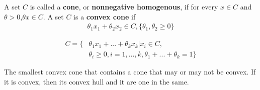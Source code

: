 \documentclass{article}
\begin{document}
\begin{definition}[Cone]
  A set $C$ is called a \textbf{cone}, or \textbf{nonnegative homogenous}, if for every
  $x\in C$ and $\theta>0$,$\theta x\in C$.  A set $C$ is a \textbf{convex cone} if
  \begin{align}
    \theta_1x_1+\theta_2x_2\in C,\{\theta_1,\theta_2\geq 0\}
  \end{align}
\end{definition}
\begin{definition}
  \begin{align}
    C=\{&\theta_1x_1+...+\theta_kx_k|x_i\in C,\\
    \nonumber
    &\theta_i\geq 0,i=1,...,k,\theta_1+...+\theta_k=1\}
  \end{align}
\end{definition}
\begin{headered_note}
  The smallest convex cone that contains a cone that may or may not be convex.
  If it is convex, then its convex hull and it are one in the same.
\end{headered_note}
\end{document}
